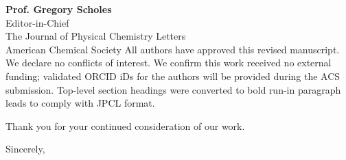 \documentclass[11pt,a4paper]{letter}
\begin{document}
\begin{letter}{
\textbf{Prof. Gregory Scholes}\\
Editor-in-Chief\\
The Journal of Physical Chemistry Letters\\
American Chemical Society
}
All authors have approved this revised manuscript. We declare no conflicts of interest.
We confirm this work received no external funding; validated ORCID iDs for the authors will be provided during the ACS submission. Top-level section headings were converted to bold run-in paragraph leads to comply with JPCL format.

Thank you for your continued consideration of our work.

\closing{Sincerely,}


\end{letter}
\end{document}
